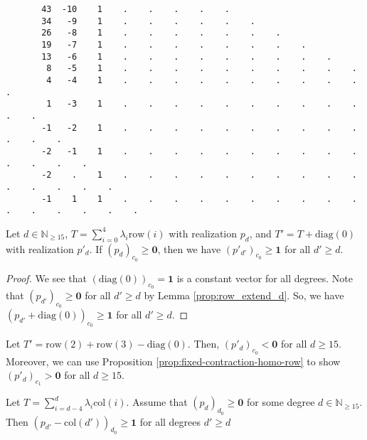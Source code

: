 \begin{example}
\begin{verbatim}
       43  -10    1    .    .    .    .    . 
       34   -9    1    .    .    .    .    .    . 
       26   -8    1    .    .    .    .    .    .    . 
       19   -7    1    .    .    .    .    .    .    .    . 
       13   -6    1    .    .    .    .    .    .    .    .    . 
        8   -5    1    .    .    .    .    .    .    .    .    .    . 
        4   -4    1    .    .    .    .    .    .    .    .    .    .    . 
        1   -3    1    .    .    .    .    .    .    .    .    .    .    .    . 
       -1   -2    1    .    .    .    .    .    .    .    .    .    .    .    .    . 
       -2   -1    1    .    .    .    .    .    .    .    .    .    .    .    .    .    . 
       -2    .    1    .    .    .    .    .    .    .    .    .    .    .    .    .    .    . 
       -1    1    1    .    .    .    .    .    .    .    .    .    .    .    .    .    .    .    . 
       \end{verbatim}
    \endgroup
  \end{example}

\begin{proposition}\label{prop:row_homo_zero_diag}
     Let \( d \in \mathbb{N}_{\geq 15} \), \( T = \sum_{i=0}^4 \lambda_i \mathrm{row}(i)\) with realization \( p_d \), and \( T' = T + \mathrm{diag}(0) \) with realization \( p'_d \). If \( (p_d)_{c_0} \geq \mathbf{0} \), then we have \( (p'_{d'})_{c_0} \geq \mathbf 1 \) for all \( d' \geq d \).
\end{proposition}
  
  
\begin{proof}
    We see that \( (\mathrm{diag}(0))_{c_0} = \mathbf 1 \) is a constant vector for all degrees. Note that \( (p_{d'})_{c_0} \geq \mathbf 0 \) for all \( d' \geq d \) by Lemma \ref{prop:row_extend_d}. So, we have \( (p_{d'} + \mathrm{diag}(0))_{c_0} \geq \mathbf 1 \) for all \( d' \geq d \).
\end{proof}
  
  
  
\begin{example}
    Let \( T' = \mathrm{row}(2) + \mathrm{row}(3) - \mathrm{diag}(0) \).
    Then, \( (p'_d)_{c_0} < \mathbf{0} \) for all \( d \geq 15 \). Moreover, we can use Proposition \ref{prop:fixed-contraction-homo-row} to show \( (p'_d)_{c_1} > \mathbf{0} \) for all \( d \geq 15 \).
  \end{example}

\begin{proposition}\label{prop:col_homo_d_zero_diag}
Let \( T = \sum_{i=d-4}^d \lambda_i \mathrm{col}(i)\). Assume that \( (p_d)_{d_0} \geq \mathbf{0} \) for some degree \( d \in \mathbb{N}_{\geq 15} \). Then \( (p_{d'} - \mathrm{col}(d'))_{d_0} \geq \mathbf 1 \) for all degrees \( d' \geq d \)
\end{proposition}
  
